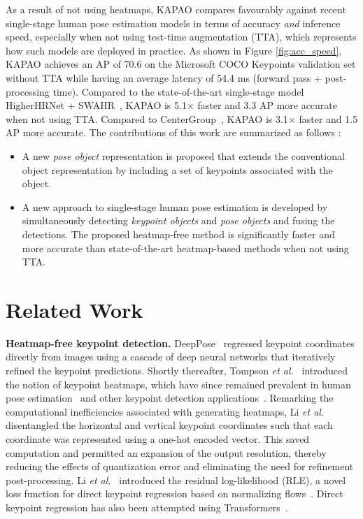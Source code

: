 \documentclass[runningheads]{llncs}
\newcommand{\etal}{\textit{et al.}}
\newcommand\hlll[1]{\bgroup
  \hskip0pt\color{black}#1\egroup
}
\begin{document}
As a result of not using heatmaps, KAPAO compares favourably against recent single-stage human pose estimation models in terms of accuracy \textit{and} inference speed, especially when not using test-time augmentation (TTA), which \hlll{represents} how such models are deployed in practice. As shown in Figure \ref{fig:acc_speed}, KAPAO achieves an AP of 70.6 on the Microsoft COCO Keypoints validation set without TTA \hlll{while having} an average latency of 54.4 ms (forward pass + post-processing time). Compared to the state-of-the-art single-stage model HigherHRNet + SWAHR~\cite{luo2021rethinking}, KAPAO is 5.1$\times$ faster and 3.3 AP more accurate when not using TTA. Compared to CenterGroup~\cite{braso2021center}, KAPAO is 3.1$\times$ faster and 1.5 AP more accurate. 
The contributions of this work are summarized \hlll{as follows}:
\begin{itemize}
    \item A new \textit{pose object} representation is proposed that extends the conventional object representation by including a set of keypoints associated with the object. 
    \smallskip
    \item A new approach to single-stage human pose estimation is developed by simultaneously detecting \textit{keypoint objects} and \textit{pose objects} and fusing the detections. The proposed heatmap-free method is significantly faster and more accurate than state-of-the-art heatmap-based methods when not \hlll{using} TTA.
\end{itemize} 


\section{Related Work}
\smallskip\noindent\textbf{Heatmap-free keypoint detection.}
DeepPose~\cite{toshev2014deeppose} regressed keypoint coordinates directly from images using a cascade of deep neural networks that iteratively refined the keypoint predictions. Shortly thereafter, Tompson \etal~\cite{tompson2014joint} introduced the notion of keypoint heatmaps, which have since remained prevalent in human pose estimation~\cite{wei2016convolutional, newell2016stacked, cao2017realtime, chen2018cascaded, xiao2018simple, sun2019deep, cheng2020higherhrnet, geng2021bottom, mcnally2021evopose2d, khirodkar2021multi, yang2021transpose} and other keypoint \hlll{detection} applications~\cite{iqbal2018hand, dong2018style, wang2019adaptive, huang2020awr, vats2019pucknet}. Remarking the computational inefficiencies associated with generating heatmaps, Li \etal~\cite{li20212d} disentangled the horizontal and vertical keypoint coordinates such that each coordinate was represented using a one-hot encoded vector. \hlll{This} saved computation and permitted an expansion of the output resolution, thereby reducing the effects of quantization error and eliminating the need for refinement post-processing. Li \etal~\cite{li2021human} introduced the residual log-likelihood (RLE), a novel loss function for direct keypoint regression based on normalizing flows~\cite{rezende2015variational}. Direct keypoint regression has also been attempted using Transformers~\cite{li2021pose}. 
\end{document}
